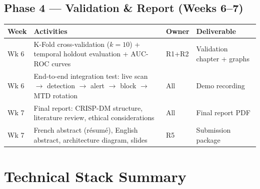 \documentclass[12pt,a4paper]{article}
\begin{document}
\subsection*{Phase 4 --- Validation \& Report (Weeks 6--7)}

\begin{table}[h!]
\centering
\small
\begin{tabular}{C{1.2cm} L{7.5cm} C{1.5cm} L{3.5cm}}
  \toprule
  \textbf{Week} & \textbf{Activities} & \textbf{Owner} & \textbf{Deliverable} \\
  \midrule
  Wk 6 & K-Fold cross-validation ($k=10$) + temporal holdout evaluation + AUC-ROC curves & R1+R2 & Validation chapter + graphs \\
  Wk 6 & End-to-end integration test: live scan $\rightarrow$ detection $\rightarrow$ alert $\rightarrow$ block $\rightarrow$ MTD rotation & All & Demo recording \\
  Wk 7 & Final report: CRISP-DM structure, literature review, ethical considerations & All & Final report PDF \\
  Wk 7 & French abstract (r\'{e}sum\'{e}), English abstract, architecture diagram, slides & R5 & Submission package \\
  \bottomrule
\end{tabular}
\end{table}


\section{Technical Stack Summary}
\end{document}
